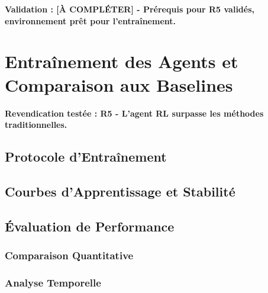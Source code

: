 \textbf{Validation : [À COMPLÉTER] - Prérequis pour R5 validés, environnement prêt pour l'entraînement.}

\section{Entraînement des Agents et Comparaison aux Baselines}
\label{sec:entrainement_agents}

\textbf{Revendication testée : R5 - L'agent RL surpasse les méthodes traditionnelles.}

\subsection{Protocole d'Entraînement}
\label{subsec:protocole_entrainement}

\subsection{Courbes d'Apprentissage et Stabilité}
\label{subsec:courbes_apprentissage}

\subsection{Évaluation de Performance}
\label{subsec:evaluation_performance}

\subsubsection{Comparaison Quantitative}

\subsubsection{Analyse Temporelle}

